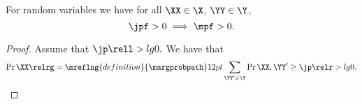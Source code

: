 \begin{proposition}
  For random variables 
  we have for all $\XX \in \X$, $\YY \in \Y$,
  $$\jpf > 0 \implies \mpf > 0.$$%
\end{proposition}

\begin{proof}
  Assume that $\jp \rell > lg 0.$
  We have that
  $$\Pr{\XX} \relrg = \mreflng{definition}{\margprobpath} 12pt \sum_{\YY' \in \Y}\Pr{\XX, \YY'} \ge \jp \relr > lg 0.$$%
\end{proof}
